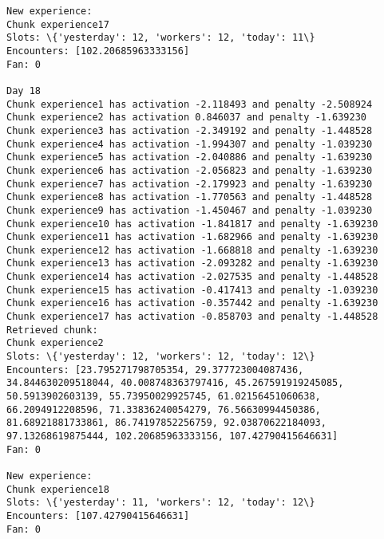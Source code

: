 \documentclass[11pt]{article}
\begin{document}
\begin{Verbatim}[commandchars=\\\{\}]
New experience:
Chunk experience17
Slots: \{'yesterday': 12, 'workers': 12, 'today': 11\}
Encounters: [102.20685963333156]
Fan: 0

Day 18
Chunk experience1 has activation -2.118493 and penalty -2.508924
Chunk experience2 has activation 0.846037 and penalty -1.639230
Chunk experience3 has activation -2.349192 and penalty -1.448528
Chunk experience4 has activation -1.994307 and penalty -1.039230
Chunk experience5 has activation -2.040886 and penalty -1.639230
Chunk experience6 has activation -2.056823 and penalty -1.639230
Chunk experience7 has activation -2.179923 and penalty -1.639230
Chunk experience8 has activation -1.770563 and penalty -1.448528
Chunk experience9 has activation -1.450467 and penalty -1.039230
Chunk experience10 has activation -1.841817 and penalty -1.639230
Chunk experience11 has activation -1.682966 and penalty -1.639230
Chunk experience12 has activation -1.668818 and penalty -1.639230
Chunk experience13 has activation -2.093282 and penalty -1.639230
Chunk experience14 has activation -2.027535 and penalty -1.448528
Chunk experience15 has activation -0.417413 and penalty -1.039230
Chunk experience16 has activation -0.357442 and penalty -1.639230
Chunk experience17 has activation -0.858703 and penalty -1.448528
Retrieved chunk:
Chunk experience2
Slots: \{'yesterday': 12, 'workers': 12, 'today': 12\}
Encounters: [23.795271798705354, 29.377723004087436, 34.844630209518044, 40.008748363797416, 45.267591919245085, 50.5913902603139, 55.73950029925745, 61.02156451060638, 66.2094912208596, 71.33836240054279, 76.56630994450386, 81.68921881733861, 86.74197852256759, 92.03870622184093, 97.13268619875444, 102.20685963333156, 107.42790415646631]
Fan: 0

New experience:
Chunk experience18
Slots: \{'yesterday': 11, 'workers': 12, 'today': 12\}
Encounters: [107.42790415646631]
Fan: 0


\end{Verbatim}
\end{document}
